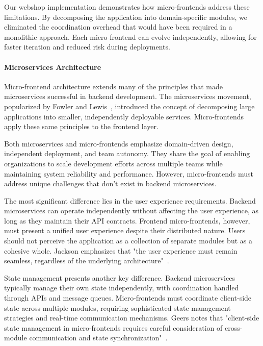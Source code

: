 \documentclass[12pt,a4paper]{report}
\begin{document}
Our webshop implementation demonstrates how micro-frontends address these limitations. By decomposing the application into domain-specific modules, we eliminated the coordination overhead that would have been required in a monolithic approach. Each micro-frontend can evolve independently, allowing for faster iteration and reduced risk during deployments.

\paragraph{Microservices Architecture}

Micro-frontend architecture extends many of the principles that made microservices successful in backend development. The microservices movement, popularized by Fowler and Lewis~\cite{fowler2014microservices}, introduced the concept of decomposing large applications into smaller, independently deployable services. Micro-frontends apply these same principles to the frontend layer.

Both microservices and micro-frontends emphasize domain-driven design, independent deployment, and team autonomy. They share the goal of enabling organizations to scale development efforts across multiple teams while maintaining system reliability and performance. However, micro-frontends must address unique challenges that don't exist in backend microservices.

The most significant difference lies in the user experience requirements. Backend microservices can operate independently without affecting the user experience, as long as they maintain their API contracts. Frontend micro-frontends, however, must present a unified user experience despite their distributed nature. Users should not perceive the application as a collection of separate modules but as a cohesive whole. Jackson emphasizes that "the user experience must remain seamless, regardless of the underlying architecture"~\cite{jackson2016microfrontends}.

State management presents another key difference. Backend microservices typically manage their own state independently, with coordination handled through APIs and message queues. Micro-frontends must coordinate client-side state across multiple modules, requiring sophisticated state management strategies and real-time communication mechanisms. Geers notes that "client-side state management in micro-frontends requires careful consideration of cross-module communication and state synchronization"~\cite{geers2019microfrontends}.
\end{document}
